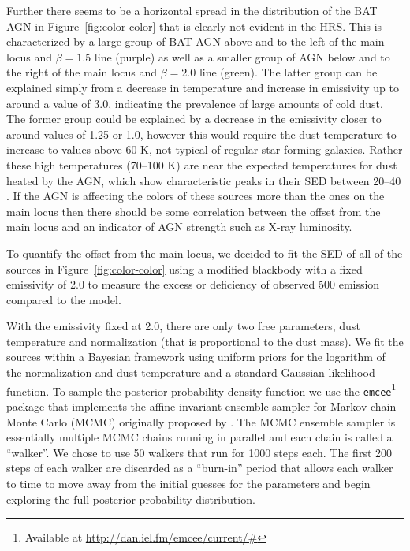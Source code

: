 Further there seems to be a horizontal spread in the distribution of the BAT AGN in Figure~\ref{fig:color-color} that is clearly not evident in the HRS. This is characterized by a large group of BAT AGN above and to the left of the main locus and $\beta=1.5$ line (purple) as well as a smaller group of AGN below and to the right of the main locus and $\beta=2.0$ line (green). The latter group can be explained simply from a decrease in temperature and increase in emissivity up to around a value of 3.0, indicating the prevalence of large amounts of cold dust. The former group could be explained by a decrease in the emissivity closer to around values of 1.25 or 1.0, however this would require the dust temperature to increase to values above 60 K, not typical of regular star-forming galaxies. Rather these high temperatures (70--100 K) are near the expected temperatures for dust heated by the AGN, which show characteristic peaks in their SED between 20--40 \um{} \citep{Richards:2006fj,Netzer:2007ve,Mullaney:2011yq}. If the AGN is affecting the colors of these sources more than the ones on the main locus then there should be some correlation between the offset from the main locus and an indicator of AGN strength such as X-ray luminosity. 

To quantify the offset from the main locus, we decided to fit the SED of all of the sources in Figure~\ref{fig:color-color} using a modified blackbody with a fixed emissivity of 2.0 to measure the excess or deficiency of observed 500 \um{} emission compared to the model. 

With the emissivity fixed at 2.0, there are only two free parameters, dust temperature and normalization (that is proportional to the dust mass). We fit the sources within a Bayesian framework using uniform priors for the logarithm of the normalization and dust temperature and a standard Gaussian likelihood function. To sample the posterior probability density function we use the \texttt{emcee}\footnote{Available at \url{http://dan.iel.fm/emcee/current/#}} package \citep{Foreman_Mackey_2013} that implements the affine-invariant ensemble sampler for Markov chain Monte Carlo (MCMC) originally proposed by \citet{Goodman_2010}. The MCMC ensemble sampler is essentially multiple MCMC chains running in parallel and each chain is called a ``walker''. We chose to use 50 walkers that run for 1000 steps each. The first 200 steps of each walker are discarded as a ``burn-in'' period that allows each walker to time to move away from the initial guesses for the parameters and begin exploring the full posterior probability distribution.

